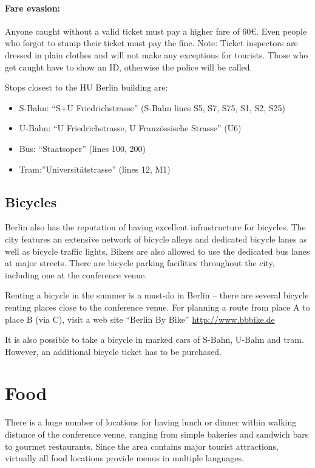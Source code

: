 \paragraph{Fare evasion:}
Anyone caught without a valid ticket must pay a higher fare of 60€. Even people who forgot to stamp their ticket must pay the fine. Note: Ticket inspectors are dressed in plain clothes and will not make any exceptions for tourists. Those who get caught have to show an ID, otherwise the police will be called.

Stops closest to the HU Berlin building are:
\begin{itemize}
  \item S-Bahn: ``S+U Friedrichstrasse'' (S-Bahn lines S5, S7, S75, S1, S2, S25)
  \item U-Bahn: ``U Friedrichstrasse, U Franz\"{o}ssische Strasse'' (U6)
  \item Bus: ``Staatsoper'' (lines 100, 200)
  \item Tram:''Universit\"{a}tstrasse'' (lines 12, M1)
\end{itemize}

\subsection{Bicycles}

Berlin also has the reputation of having excellent infrastructure for bicycles. The city features an extensive network of bicycle alleys and dedicated bicycle lanes as well as bicycle traffic lights. Bikers are also allowed to use the dedicated bus lanes at major streets. There are bicycle parking facilities throughout the city, including one at the conference venue.

Renting a bicycle in the summer is a must-do in Berlin -- there are several bicycle renting places close to the conference venue. For planning a route from place A to place B (via C), visit a web site ``Berlin By Bike'' \url{http://www.bbbike.de}

It is also possible to take a bicycle in marked cars of S-Bahn, U-Bahn and tram. However, an additional bicycle ticket has to be purchased.

\section{Food}

There is a huge number of locations for having lunch or dinner within walking distance of the conference venue, ranging from simple bakeries and sandwich bars to gourmet restaurants. Since the area contains major tourist attractions, virtually all food locations provide menus in multiple languages.

